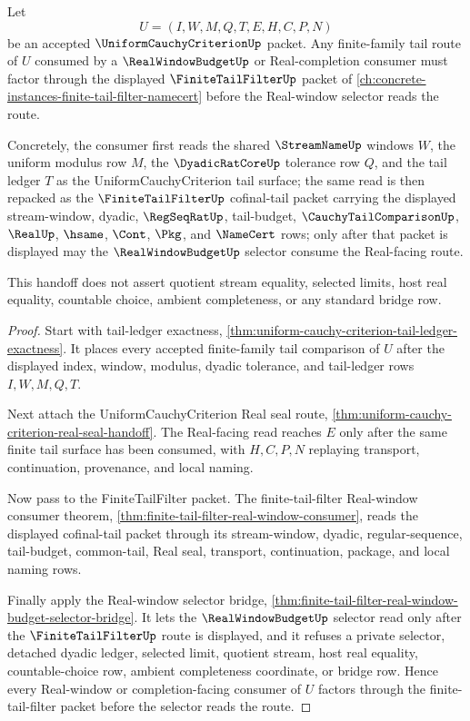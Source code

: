 \begin{theorem}
\label{thm:uniform-cauchy-criterion-finite-tail-filter-real-window-handoff}
Let
$$
U=(I,W,M,Q,T,E,H,C,P,N)
$$
be an accepted $\UniformCauchyCriterionUp$ packet. Any finite-family tail route
of $U$ consumed by a $\RealWindowBudgetUp$ or Real-completion consumer must
factor through the displayed $\FiniteTailFilterUp$ packet of
\autoref{ch:concrete-instances-finite-tail-filter-namecert} before the
Real-window selector reads the route.

Concretely, the consumer first reads the shared $\StreamNameUp$ windows $W$,
the uniform modulus row $M$, the $\DyadicRatCoreUp$ tolerance row $Q$, and the
tail ledger $T$ as the UniformCauchyCriterion tail surface; the same read is
then repacked as the $\FiniteTailFilterUp$ cofinal-tail packet carrying the
displayed stream-window, dyadic, $\RegSeqRatUp$, tail-budget,
$\CauchyTailComparisonUp$, $\RealUp$, $\hsame$, $\Cont$, $\Pkg$, and
$\NameCert$ rows; only after that packet is displayed may the
$\RealWindowBudgetUp$ selector consume the Real-facing route.

This handoff does not assert quotient stream equality, selected limits, host
real equality, countable choice, ambient completeness, or any standard bridge
row.
\end{theorem}
\begin{proof}
Start with tail-ledger exactness,
\autoref{thm:uniform-cauchy-criterion-tail-ledger-exactness}. It places every
accepted finite-family tail comparison of $U$ after the displayed index,
window, modulus, dyadic tolerance, and tail-ledger rows $I,W,M,Q,T$.

Next attach the UniformCauchyCriterion Real seal route,
\autoref{thm:uniform-cauchy-criterion-real-seal-handoff}. The Real-facing read
reaches $E$ only after the same finite tail surface has been consumed, with
$H,C,P,N$ replaying transport, continuation, provenance, and local naming.

Now pass to the FiniteTailFilter packet. The finite-tail-filter Real-window
consumer theorem,
\autoref{thm:finite-tail-filter-real-window-consumer}, reads the displayed
cofinal-tail packet through its stream-window, dyadic, regular-sequence,
tail-budget, common-tail, Real seal, transport, continuation, package, and
local naming rows.

Finally apply the Real-window selector bridge,
\autoref{thm:finite-tail-filter-real-window-budget-selector-bridge}. It lets
the $\RealWindowBudgetUp$ selector read only after the
$\FiniteTailFilterUp$ route is displayed, and it refuses a private selector,
detached dyadic ledger, selected limit, quotient stream, host real equality,
countable-choice row, ambient completeness coordinate, or bridge row. Hence
every Real-window or completion-facing consumer of $U$ factors through the
finite-tail-filter packet before the selector reads the route.
\end{proof}


